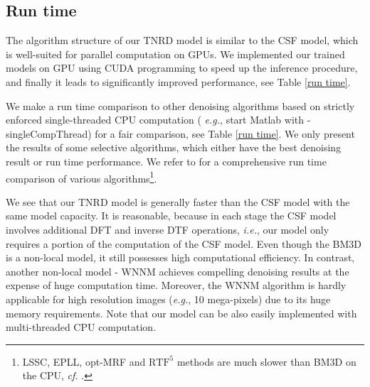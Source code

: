 \documentclass[10pt,journal,compsoc]{IEEEtran}
\newcommand{\eg}{\emph{e.g.}}
\newcommand{\ie}{\emph{i.e.}}
\begin{document}
\subsection{Run time} 
The algorithm structure of our TNRD model is similar to the CSF model, which is well-suited 
for parallel computation on GPUs. We implemented our trained models on GPU using CUDA programming to 
speed up the inference procedure, and finally it leads to significantly improved 
performance, see Table \ref{run time}. 
\begin{comment}
We see that for the images of size up to $3\text{\normalfont K} \times 3\text{\normalfont K}$, 
the $\text{TNRD}^5_{7\times 7}$ model is still able to  
accomplish the denoising task in less than 1s. 
\end{comment}
We make a run time comparison to other denoising algorithms based on strictly enforced single-threaded CPU computation (
\eg, start Matlab with -singleCompThread) for a fair comparison, see Table \ref{run time}. We only 
present the results of some selective algorithms, which either have the best denoising result or run time performance. 
We refer to \cite{CSF2014} for a comprehensive run time comparison of various algorithms\footnote{
LSSC, EPLL, opt-MRF and $\text{RTF}^5$ methods are much slower than BM3D on the CPU, \textit{cf.} \cite{CSF2014}. }.

We see that our TNRD model is generally faster than the CSF model with the same model capacity. 
It is reasonable, because in each stage the CSF model involves additional DFT and inverse DTF operations, \ie, 
our model only requires a portion of the computation of the CSF model. Even though the BM3D is a non-local model, 
it still possesses high computational efficiency. In contrast, another non-local model - WNNM achieves compelling 
denoising results at the expense of huge computation time. Moreover, the WNNM algorithm is hardly applicable for 
high resolution images (\eg, 10 mega-pixels) due to its huge memory requirements. 
Note that our model can be also easily implemented with multi-threaded CPU computation. 

\begin{comment}
We show the run time and restoration performance of the above algorithms based on 68 test images 
for the noise level $\sigma = 25$ in Figure \ref{fig:speed}. 
\end{comment}
\end{document}
